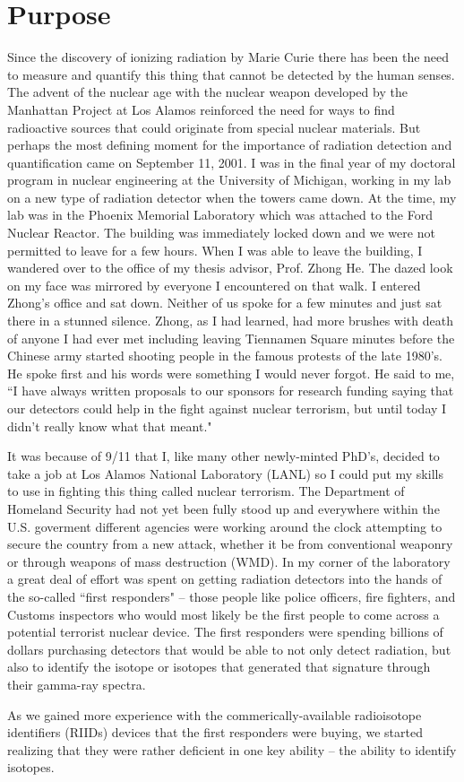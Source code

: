 \chapter{Purpose}

Since the discovery of ionizing radiation by Marie Curie there has been the need to measure and quantify this thing that cannot be detected by the human senses.  The advent of the nuclear age with the nuclear weapon developed by the Manhattan Project at Los Alamos reinforced the need for ways to find radioactive sources that could originate from special nuclear materials.  But perhaps the most defining moment for the importance of radiation detection and quantification came on September 11, 2001.  I was in the final year of my doctoral program in nuclear engineering at the University of Michigan, working in my lab on a new type of radiation detector when the towers came down.  At the time, my lab was in the Phoenix Memorial Laboratory which was attached to the Ford Nuclear Reactor.  The building was immediately locked down and we were not permitted to leave for a few hours.  When I was able to leave the building, I wandered over to the office of my thesis advisor, Prof. Zhong He.  The dazed look on my face was mirrored by everyone I encountered on that walk.  I entered Zhong's office and sat down.  Neither of us spoke for a few minutes and just sat there in a stunned silence.  Zhong, as I had learned, had more brushes with death of anyone I had ever met including leaving Tiennamen Square minutes before the Chinese army started shooting people in the famous protests of the late 1980's.  He spoke first and his words were something I would never forgot.  He said to me, ``I have always written proposals to our sponsors for research funding saying that our detectors could help in the fight against nuclear terrorism, but until today I didn't really know what that meant."

It was because of 9/11 that I, like many other newly-minted PhD's, decided to take a job at Los Alamos National Laboratory (LANL) so I could put my skills to use in fighting this thing called nuclear terrorism.  The Department of Homeland Security had not yet been fully stood up and everywhere within the U.S. goverment different agencies were working around the clock attempting to secure the country from a new attack, whether it be from conventional weaponry or through weapons of mass destruction (WMD).  In my corner of the laboratory a great deal of effort was spent on getting radiation detectors into the hands of the so-called ``first responders" -- those people like police officers, fire fighters, and Customs inspectors who would most likely be the first people to come across a potential terrorist nuclear device.  The first responders were spending billions of dollars purchasing detectors that would be able to not only detect radiation, but also to identify the isotope or isotopes that generated that signature through their gamma-ray spectra.

As we gained more experience with the commerically-available radioisotope identifiers (RIIDs) devices that the first responders were buying, we started realizing that they were rather deficient in one key ability -- the ability to identify isotopes.  